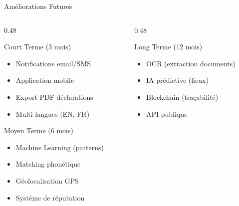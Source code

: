 \documentclass[aspectratio=169]{beamer}
\begin{document}
\begin{frame}{Améliorations Futures}
    \begin{columns}[T]
        \begin{column}{0.48\textwidth}
            \begin{block}{Court Terme (3 mois)}
                \begin{itemize}
                    \item Notifications email/SMS
                    \item Application mobile
                    \item Export PDF déclarations
                    \item Multi-langues (EN, FR)
                \end{itemize}
            \end{block}

            \vspace{0.3cm}

            \begin{block}{Moyen Terme (6 mois)}
                \begin{itemize}
                    \item Machine Learning (patterns)
                    \item Matching phonétique
                    \item Géolocalisation GPS
                    \item Système de réputation
                \end{itemize}
            \end{block}
        \end{column}
        \begin{column}{0.48\textwidth}
            \begin{block}{Long Terme (12 mois)}
                \begin{itemize}
                    \item OCR (extraction documents)
                    \item IA prédictive (lieux)
                    \item Blockchain (traçabilité)
                    \item API publique
                \end{itemize}
            \end{block}

            \vspace{0.3cm}


\end{column}
\end{columns}
\end{frame}
\end{document}
